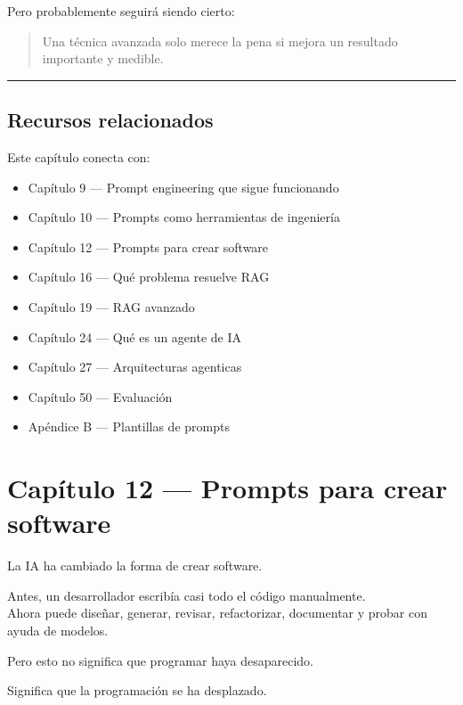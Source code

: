 Pero probablemente seguirá siendo cierto:

\begin{quote}
Una técnica avanzada solo merece la pena si mejora un resultado
importante y medible.
\end{quote}

\begin{center}\rule{0.5\linewidth}{0.5pt}\end{center}

\section{Recursos relacionados}\label{recursos-relacionados-10}

Este capítulo conecta con:

\begin{itemize}
\tightlist
\item
  Capítulo 9 --- Prompt engineering que sigue funcionando
\item
  Capítulo 10 --- Prompts como herramientas de ingeniería
\item
  Capítulo 12 --- Prompts para crear software
\item
  Capítulo 16 --- Qué problema resuelve RAG
\item
  Capítulo 19 --- RAG avanzado
\item
  Capítulo 24 --- Qué es un agente de IA
\item
  Capítulo 27 --- Arquitecturas agenticas
\item
  Capítulo 50 --- Evaluación
\item
  Apéndice B --- Plantillas de prompts
\end{itemize}

\newpage

\chapter{Capítulo 12 --- Prompts para crear
software}\label{capuxedtulo-12-prompts-para-crear-software}

La IA ha cambiado la forma de crear software.

Antes, un desarrollador escribía casi todo el código manualmente.\\
Ahora puede diseñar, generar, revisar, refactorizar, documentar y probar
con ayuda de modelos.

Pero esto no significa que programar haya desaparecido.

Significa que la programación se ha desplazado.

